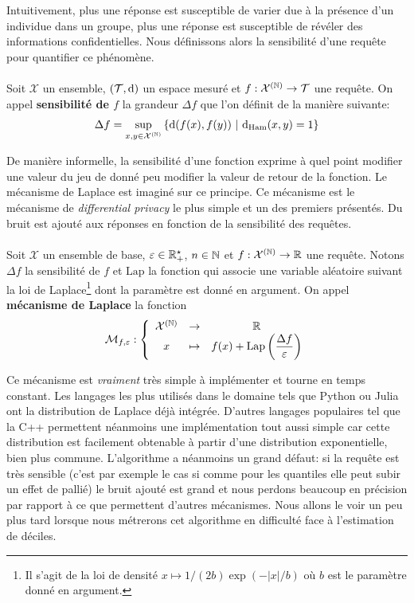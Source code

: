 Intuitivement, plus une réponse est susceptible de varier due à la présence d'un individue dans un groupe, plus une réponse est susceptible de révéler des informations confidentielles. Nous définissons alors la sensibilité d'une requête pour quantifier ce phénomène.\\

\\
Soit \(\mathcal X\) un ensemble, \((\mathcal T, \mathrm{d})\) un espace mesuré et \(f : \mathcal X^{(\mathbb{N})} \to \mathcal T\) une requête. On appel \textbf{sensibilité de \(f\)} la grandeur \(\Delta f\) que l'on définit de la manière suivante:
\[
    \Delta f = \underset{x, y \in \mathcal X^{(\mathbb{N})}}{\sup} \left\{ \mathrm{d}(f(x), f(y)) \ | \ \mathrm{d}_{\text{Ham}}(x,y) = 1 \right\}    
\]

De manière informelle, la sensibilité d'une fonction exprime à quel point modifier une valeur du jeu de donné peu modifier la valeur de retour de la fonction. Le mécanisme de {\sc Laplace} \cite{dwork2014the} est imaginé sur ce principe. Ce mécanisme est le mécanisme de \textit{differential privacy} le plus simple et un des premiers présentés. Du bruit est ajouté aux réponses en fonction de la sensibilité des requêtes.\\

\\
Soit \(\mathcal X\) un ensemble de base, \(\varepsilon \in \mathbb{R}_+^\star\), \(n \in \mathbb{N}\) et \(f : \mathcal X^{(\mathbb{N})} \to \mathbb{R}\) une requête. Notons \(\Delta f\) la sensibilité de \(f\) et \(\text{Lap}\) la fonction qui associe une variable aléatoire suivant la loi de {\sc Laplace}\footnote{Il s'agit de la loi de densité \(x \mapsto 1/(2b) \exp(-|x|/b)\) où \(b\) est le paramètre donné en argument.} dont la paramètre est donné en argument. On appel \textbf{mécanisme de {\sc Laplace}} la fonction 
\[
    \mathcal M_{f,\varepsilon} : \left\{ 
        \begin{array}{ccc}
            \mathcal X^{(\mathbb{N})} & \to & \mathbb{R}\\
            x & \mapsto & f(x) + \text{Lap}\left( \dfrac{\Delta f}{\varepsilon} \right)
        \end{array}
    \right.    
\]

Ce mécanisme est \textit{vraiment} très simple à implémenter et tourne en temps constant. Les langages les plus utilisés dans le domaine tels que Python ou Julia ont la distribution de {\sc Laplace} déjà intégrée. D'autres langages populaires tel que la C++ permettent néanmoins une implémentation tout aussi simple car cette distribution est facilement obtenable à partir d'une distribution exponentielle, bien plus commune. L'algorithme a néanmoins un grand défaut: si la requête est très sensible (c'est par exemple le cas si comme pour les quantiles elle peut subir un effet de pallié) le bruit ajouté est grand et nous perdons beaucoup en précision par rapport à ce que permettent d'autres mécanismes. Nous allons le voir un peu plus tard lorsque nous métrerons cet algorithme en difficulté face à l'estimation de déciles.\\

